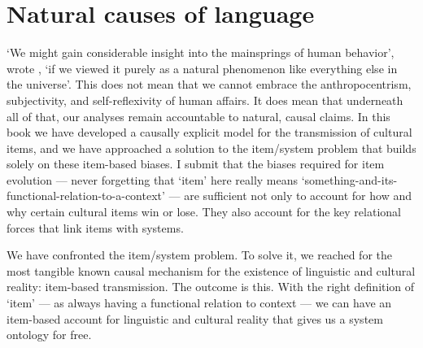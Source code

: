 \section{Natural causes of language}


\textquoteleft We might gain considerable insight into the mainsprings of human 
behavior', wrote \citet[v]{zipf_human_1949}, \textquoteleft if we viewed it purely as a natural 
phenomenon like everything else in the universe'. This does not mean 
that we cannot embrace the anthropocentrism, subjectivity, and 
self-reflexivity of human affairs. It does mean that underneath all of 
that, our analyses remain accountable to natural, causal claims. In this book we have developed a causally explicit model for the 
transmission of cultural items, and we have approached a solution to the 
item/system problem that builds solely on these item-based biases. I 
submit that the biases required for item evolution --- never forgetting that 
\textquoteleft item' here really means 
\textquoteleft something-and-its-functional-relation-to-a-context' --- are sufficient not 
only to account for how and why certain cultural items win or lose. They 
also account for the key relational forces that link items 
with systems. 


We have confronted the item/system problem. To solve it, we 
reached for the most tangible known causal mechanism for the existence 
of linguistic and cultural reality: item-based transmission. The outcome is this. With the right definition of `item' --- as always having a functional relation to context --- we can have 
an item-based account for linguistic and cultural reality that gives us 
a system ontology for free.




